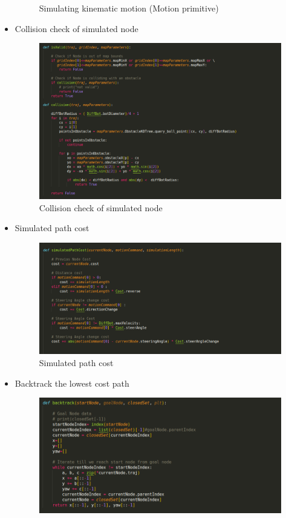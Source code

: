 \documentclass[12pt,a4paper]{article}
\begin{document}
\begin{itemize}
\begin{figure}[h!]
\begin{center}
        \end{center}
        \caption{Simulating kinematic motion (Motion primitive)}
        \label{fig:Hybrid_A-star}
        \end{figure}
    \item Collision check of simulated node
        \begin{figure}[h!]
        \begin{center}
        \includegraphics[width=0.8\columnwidth]{algorithm/collision_check.png}
        \end{center}
        \caption{Collision check of simulated node}
        \label{fig:Hybrid_A-star}
        \end{figure}
    \item Simulated path cost
        \begin{figure}[h!]
        \begin{center}
        \includegraphics[width=0.8\columnwidth]{algorithm/simulation_cost.png}
        \end{center}
        \caption{Simulated path cost}
        \label{fig:Hybrid_A-star}
        \end{figure}
    \item Backtrack the lowest cost path 
        \begin{figure}[h!]
        \begin{center}
        \includegraphics[width=0.8\columnwidth]{algorithm/backtrack.png}

\end{center}
\end{figure}
\end{itemize}
\end{document}
